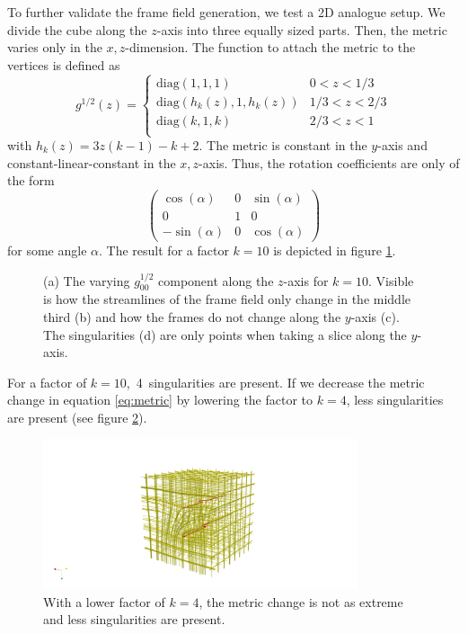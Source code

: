 \documentclass[../thesis.tex]{subfiles}
\begin{document}
To further validate the frame field generation, we test a 2D analogue setup.
We divide the cube along
the $z$-axis into three equally sized parts.
Then, the metric varies only in the $x,z$-dimension.
The function to attach the metric to the vertices is defined as
\begin{equation}\label{eq:metric}
g^{1/2}(z) = \begin{cases}
    \mathrm{diag}(1,1,1) &0 < z < 1/3 \\
    \mathrm{diag}(h_k(z),1,h_k(z)) &1/3 < z < 2/3 \\
    \mathrm{diag}(k,1,k) &2/3 < z < 1 \\
\end{cases}\end{equation}
with $h_k(z)=3z(k-1)-k+2$.
The metric is constant in the $y$-axis and constant-linear-constant in the $x,z$-axis.
Thus, the rotation coefficients are only of the form
$$\begin{pmatrix}
    \cos (\alpha) & 0 & \sin(\alpha) \\
    0 & 1 & 0 \\
    -\sin(\alpha) & 0 & \cos(\alpha)
\end{pmatrix}$$
for some angle $\alpha$.
The result for a factor $k=10$ is depicted in figure \ref{fig:image2}.
\begin{figure}[htb]
    \centering
    \def\svgwidth{\textwidth}
    
    \caption{(a) The varying $g^{1/2}_{00}$ component along the $z$-axis for $k=10$. Visible is how
    the streamlines of the frame field only change in the middle third (b) and how the frames do not change along the $y$-axis (c).
    The singularities (d) are only points when taking a slice along the $y$-axis.}
    \label{fig:image2}
\end{figure}
For a factor of $k=10$,~4~singularities are present.
If we decrease the metric change in equation \ref{eq:metric} by
lowering the factor to $k=4$, less singularities are present (see figure \ref{fig:image3}).
\begin{figure}[htb]
    \centering
    \includegraphics[width=25em]{figures/image3}
    \caption{With a lower factor of $k=4$, the metric change is not as extreme and less singularities are present.}
    \label{fig:image3}
\end{figure}
\end{document}
